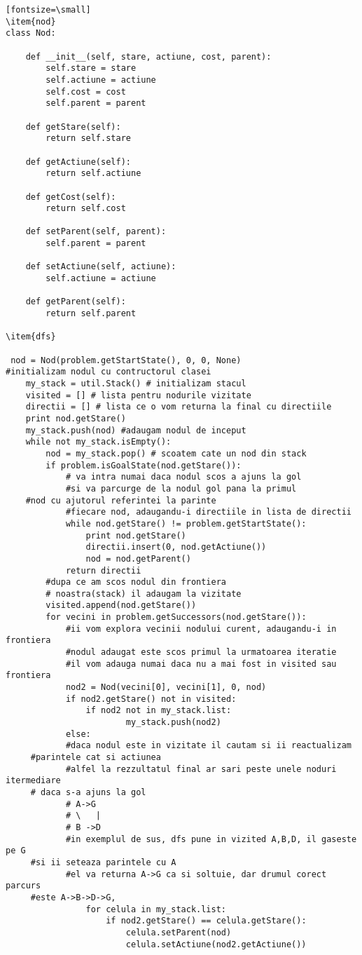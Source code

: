 
\begin{verbatim}[fontsize=\small]
\item{nod}
class Nod:

    def __init__(self, stare, actiune, cost, parent):
        self.stare = stare
        self.actiune = actiune
        self.cost = cost
        self.parent = parent

    def getStare(self):
        return self.stare

    def getActiune(self):
        return self.actiune

    def getCost(self):
        return self.cost

    def setParent(self, parent):
        self.parent = parent

    def setActiune(self, actiune):
        self.actiune = actiune

    def getParent(self):
        return self.parent

\item{dfs}

 nod = Nod(problem.getStartState(), 0, 0, None) 
#initializam nodul cu contructorul clasei
    my_stack = util.Stack() # initializam stacul
    visited = [] # lista pentru nodurile vizitate
    directii = [] # lista ce o vom returna la final cu directiile
    print nod.getStare()
    my_stack.push(nod) #adaugam nodul de inceput
    while not my_stack.isEmpty():
        nod = my_stack.pop() # scoatem cate un nod din stack
        if problem.isGoalState(nod.getStare()):
            # va intra numai daca nodul scos a ajuns la gol
            #si va parcurge de la nodul gol pana la primul 
	#nod cu ajutorul referintei la parinte
            #fiecare nod, adaugandu-i directiile in lista de directii
            while nod.getStare() != problem.getStartState():
                print nod.getStare()
                directii.insert(0, nod.getActiune())
                nod = nod.getParent()
            return directii
        #dupa ce am scos nodul din frontiera
        # noastra(stack) il adaugam la vizitate
        visited.append(nod.getStare())
        for vecini in problem.getSuccessors(nod.getStare()):
            #ii vom explora vecinii nodului curent, adaugandu-i in frontiera
            #nodul adaugat este scos primul la urmatoarea iteratie
            #il vom adauga numai daca nu a mai fost in visited sau frontiera
            nod2 = Nod(vecini[0], vecini[1], 0, nod)
            if nod2.getStare() not in visited:
                if nod2 not in my_stack.list:
                        my_stack.push(nod2)
            else:
            #daca nodul este in vizitate il cautam si ii reactualizam 
	 #parintele cat si actiunea
            #alfel la rezzultatul final ar sari peste unele noduri itermediare
	 # daca s-a ajuns la gol
            # A->G
            # \   |
            # B ->D
            #in exemplul de sus, dfs pune in vizited A,B,D, il gaseste pe G 
	 #si ii seteaza parintele cu A
            #el va returna A->G ca si soltuie, dar drumul corect parcurs 
	 #este A->B->D->G,
                for celula in my_stack.list:
                    if nod2.getStare() == celula.getStare():
                        celula.setParent(nod)
                        celula.setActiune(nod2.getActiune())


\end{verbatim}
